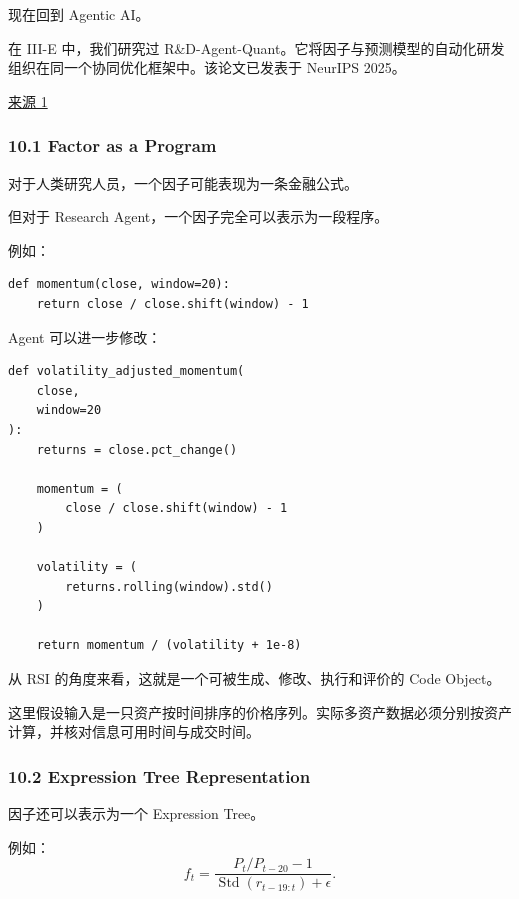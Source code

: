 现在回到 Agentic AI。

在 III-E 中，我们研究过 R\&D-Agent-Quant。它将因子与预测模型的自动化研发组织在同一个协同优化框架中。该论文已发表于 NeurIPS 2025。

\href{https://proceedings.neurips.cc/paper_files/paper/2025/hash/ac5c2b6e423883cbcacbcccf88491b78-Abstract-Datasets_and_Benchmarks_Track.html}{来源 1}

\hypertarget{part-4-63-0001-factor-as-a-program}{%
\subsubsection{10.1 Factor as a Program}\label{part-4-63-0001-factor-as-a-program}}

对于人类研究人员，一个因子可能表现为一条金融公式。

但对于 Research Agent，一个因子完全可以表示为一段程序。

例如：

\begin{verbatim}
def momentum(close, window=20):
    return close / close.shift(window) - 1
\end{verbatim}

Agent 可以进一步修改：

\begin{verbatim}
def volatility_adjusted_momentum(
    close,
    window=20
):
    returns = close.pct_change()

    momentum = (
        close / close.shift(window) - 1
    )

    volatility = (
        returns.rolling(window).std()
    )

    return momentum / (volatility + 1e-8)
\end{verbatim}

从 RSI 的角度来看，这就是一个可被生成、修改、执行和评价的 Code Object。

这里假设输入是一只资产按时间排序的价格序列。实际多资产数据必须分别按资产计算，并核对信息可用时间与成交时间。

\hypertarget{part-4-63-0001-expression-tree-representation}{%
\subsubsection{10.2 Expression Tree Representation}\label{part-4-63-0001-expression-tree-representation}}

因子还可以表示为一个 Expression Tree。

例如：
\[f_t=
\frac{
P_t/P_{t-20}-1
}{
\operatorname{Std}(r_{t-19:t})+\epsilon
}.\]

